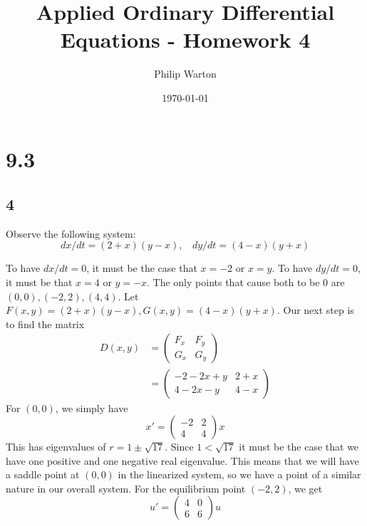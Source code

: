 \documentclass{article}
\theoremstyle{definition}
\begin{document}
\title{Applied Ordinary Differential Equations - Homework 4}
\author{Philip Warton}
\date{\today}
\maketitle
\section*{9.3}
    \subsection*{4}
        \begin{mdframed}[]
            Observe the following system:
            \[
                dx / dt = (2+x)(y-x), \ \ \ \ dy/dt=(4-x)(y+x)
            \]
        \end{mdframed} 
        To have $dx / dt = 0$, it must be the case that $x = -2$ or $x = y$.
        To have $dy / dt = 0$, it must be that $x=4$ or $y=-x$.
        The only points that cause both to be 0 are $(0,0),(-2,2),(4,4)$.
        Let $F(x,y) = (2+x)(y-x), G(x,y)=(4-x)(y+x)$.
        Our next step is to find the matrix 
        \begin{align*}
            D(x,y) &= \begin{pmatrix}
               F_x & F_y \\
               G_x & G_y 
            \end{pmatrix}\\
            &= \begin{pmatrix}
                -2 - 2x + y & 2 + x \\
                4 -2x -y & 4-x
            \end{pmatrix}
        \end{align*}
        For $(0,0)$, we simply have 
        \[
            x' = 
            \begin{pmatrix}
                -2 & 2 \\
                4 & 4
            \end{pmatrix}x
        \]
        This has eigenvalues of $r = 1 \pm \sqrt{17}$. Since $1 < \sqrt{17}$ it must be the 
        case that we have one positive and one negative real eigenvalue. This means that 
        we will have a saddle point at $(0,0)$ in the linearized system, so we have a point of 
        a similar nature in our overall system. For the equilibrium point $(-2,2)$, we get
        \[
            u' = \begin{pmatrix}
                4 & 0\\
                6 & 6
            \end{pmatrix}u
        \]
\end{document}
